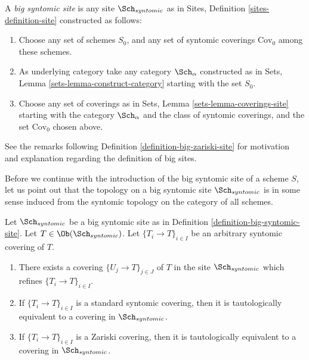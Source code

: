 \begin{definition}
\label{definition-big-syntomic-site}
A {\it big syntomic site} is any site $\Sch_{syntomic}$ as in
Sites, Definition \ref{sites-definition-site} constructed as follows:
\begin{enumerate}
\item Choose any set of schemes $S_0$, and any set of syntomic coverings
$\text{Cov}_0$ among these schemes.
\item As underlying category take any category $\Sch_\alpha$
constructed as in Sets, Lemma \ref{sets-lemma-construct-category}
starting with the set $S_0$.
\item Choose any set of coverings as in
Sets, Lemma \ref{sets-lemma-coverings-site} starting with the
category $\Sch_\alpha$ and the class of syntomic coverings,
and the set $\text{Cov}_0$ chosen above.
\end{enumerate}
\end{definition}

\noindent
See the remarks following Definition \ref{definition-big-zariski-site}
for motivation and explanation regarding the definition of big sites.

\medskip\noindent
Before we continue with the introduction of the big syntomic site of
a scheme $S$, let us point out that the topology on a big syntomic site
$\Sch_{syntomic}$ is in some sense induced from the syntomic topology
on the category of all schemes.

\begin{lemma}
\label{lemma-syntomic-induced}
Let $\Sch_{syntomic}$ be a big syntomic site as in
Definition \ref{definition-big-syntomic-site}.
Let $T \in \Ob(\Sch_{syntomic})$.
Let $\{T_i \to T\}_{i \in I}$ be an arbitrary syntomic covering of $T$.
\begin{enumerate}
\item There exists a covering $\{U_j \to T\}_{j \in J}$ of $T$ in the site
$\Sch_{syntomic}$ which refines $\{T_i \to T\}_{i \in I}$.
\item If $\{T_i \to T\}_{i \in I}$ is a standard syntomic covering, then
it is tautologically equivalent to a covering in $\Sch_{syntomic}$.
\item If $\{T_i \to T\}_{i \in I}$ is a Zariski covering, then
it is tautologically equivalent to a covering in $\Sch_{syntomic}$.
\end{enumerate}
\end{lemma}

